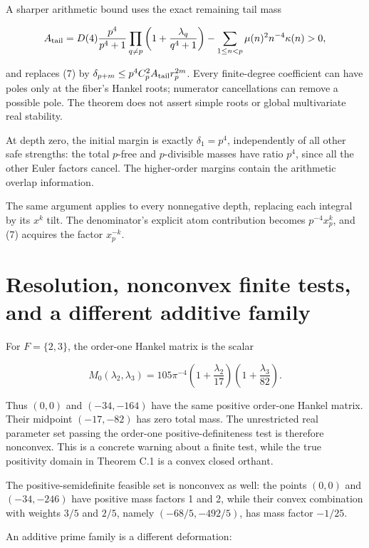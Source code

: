 A sharper arithmetic bound uses the exact remaining tail mass

\[
A_{\rm tail}=D(4)\frac{p^4}{p^4+1}
\prod_{q\ne p}\left(1+\frac{\lambda_q}{q^4+1}\right)
-\sum_{1\le n<p}\mu(n)^2n^{-4}\kappa(n)>0,
\]

and replaces (7) by \(\delta_{p+m}\le p^4 C_p^2 A_{\rm tail}r_p^{2m}\).
Every finite-degree coefficient can have poles only at the fiber's
Hankel roots; numerator cancellations can remove a possible pole. The
theorem does not assert simple roots or global multivariate real
stability.

At depth zero, the initial margin is exactly \(\delta_1=p^4\),
independently of all other safe strengths: the total \(p\)-free and
\(p\)-divisible masses have ratio \(p^4\), since all the other Euler
factors cancel. The higher-order margins contain the arithmetic overlap
information.

The same argument applies to every nonnegative depth, replacing each
integral by its \(x^k\) tilt. The denominator's explicit atom
contribution becomes \(p^{-4}x_p^k\), and (7) acquires the factor
\(x_p^{-k}\).

\hypertarget{resolution-nonconvex-finite-tests-and-a-different-additive-family}{%
\section{Resolution, nonconvex finite tests, and a different additive
family}\label{resolution-nonconvex-finite-tests-and-a-different-additive-family}}

For \(F=\{2,3\}\), the order-one Hankel matrix is the scalar

\[
M_0(\lambda_2,\lambda_3)=105\pi^{-4}
\left(1+\frac{\lambda_2}{17}\right)
\left(1+\frac{\lambda_3}{82}\right).
\]

Thus \((0,0)\) and \((-34,-164)\) have the same positive order-one
Hankel matrix. Their midpoint \((-17,-82)\) has zero total mass. The
unrestricted real parameter set passing the order-one
positive-definiteness test is therefore nonconvex. This is a concrete
warning about a finite test, while the true positivity domain in Theorem
C.1 is a convex closed orthant.

The positive-semidefinite feasible set is nonconvex as well: the points
\((0,0)\) and \((-34,-246)\) have positive mass factors 1 and 2, while
their convex combination with weights \(3/5\) and \(2/5\), namely
\((-68/5,-492/5)\), has mass factor \(-1/25\).

An additive prime family is a different deformation:

